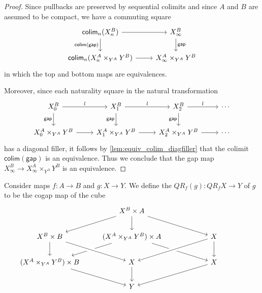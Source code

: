 \begin{proof}
Since pullbacks are preserved by sequential colimits and since $A$ and $B$ are assumed to be compact, we have a commuting square
\begin{equation*}
\begin{tikzcd}
\mathsf{colim}_n(X_n^B) \arrow[r] \arrow[d,swap,"\mathsf{colim}(\mathsf{gap})"] & X_\infty^B \arrow[d,"\mathsf{gap}"] \\
\mathsf{colim}_n(X_n^A\times_{Y^A}Y^B) \arrow[r] & X_\infty^A\times_{Y^A}Y^B
\end{tikzcd}
\end{equation*}
in which the top and bottom maps are equivalences.

Moreover, since each naturality square in the natural transformation
\begin{equation*}
\begin{tikzcd}
X_0^B \arrow[r,"l"] \arrow[d,swap,"\mathsf{gap}"] & X_1^B \arrow[r,"l"] \arrow[d,swap,"\mathsf{gap}"] & X_2^B \arrow[r,"l"] \arrow[d,swap,"\mathsf{gap}"] & \cdots \\
X_0^A\times_{Y^A} Y^B \arrow[r] & X_1^A\times_{Y^A}Y^B \arrow[r] & X_2^A\times_{Y^A}Y^B \arrow[r] & \cdots
\end{tikzcd}
\end{equation*}
has a diagonal filler, it follows by \cref{lem:equiv_colim_diagfiller} that the colimit $\mathsf{colim}(\mathsf{gap})$ is an equivalence. Thus we conclude that the gap map $X_\infty^B\to X_\infty^A\times_{Y^A}Y^B$ is an equivalence.
\end{proof}

\begin{defn}
Consider maps $f:A\to B$ and $g:X\to Y$. We define the  $QR_f(g):QR_f X\to Y$ of $g$ to be the cogap map of the cube
\begin{equation*}
\begin{tikzcd}
& X^B\times A \arrow[dl] \arrow[dr] \arrow[d] & \phantom{(X^A\times_{Y^A}Y^B)\times B} \\
X^B \times B \arrow[d] & (X^A\times_{Y^A} Y^B)\times A \arrow[dl] \arrow[dr] & X \arrow[dl,crossing over] \arrow[d] \\
(X^A\times_{Y^A}Y^B)\times B \arrow[dr] & X \arrow[from=ul,crossing over] \arrow[d] & X \arrow[dl] \\
& Y
\end{tikzcd}
\end{equation*}
\end{defn}

